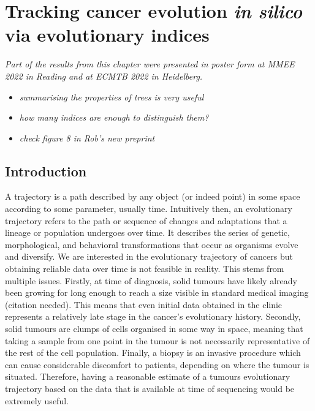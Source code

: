 \chapter{Tracking cancer evolution \textit{in silico} via evolutionary indices}
\textit{Part of the results from this chapter were presented in poster form at MMEE 2022 in Reading and at ECMTB 2022 in Heidelberg.}

\begin{itemize}
    \item \textit{summarising the properties of trees is very useful}
    \item \textit{how many indices are enough to distinguish them?}
    \item \textit{check figure 8 in Rob's new preprint}
\end{itemize}

\section{Introduction}
A trajectory is a path described by any object (or indeed point) in some space according to some parameter, usually time.  Intuitively then, an evolutionary trajectory refers to the path or sequence of changes and adaptations that a lineage or population undergoes over time. It describes the series of genetic, morphological, and behavioral transformations that occur as organisms evolve and diversify. We are interested in the evolutionary trajectory of cancers but obtaining reliable data over time is not feasible in reality. This stems from multiple issues. Firstly, at time of diagnosis, solid tumours have likely already been growing for long enough to reach a size visible in standard medical imaging (citation needed). This means that even initial data obtained in the clinic represents a relatively late stage in the cancer's evolutionary history. Secondly, solid tumours are clumps of cells organised in some way in space, meaning that taking a sample from one point in the tumour is not necessarily representative of the rest of the cell population. Finally, a biopsy is an invasive procedure which can cause considerable discomfort to patients, depending on where the tumour is situated. Therefore, having a reasonable estimate of a tumours evolutionary trajectory based on the data that is available at time of sequencing would be extremely useful.


